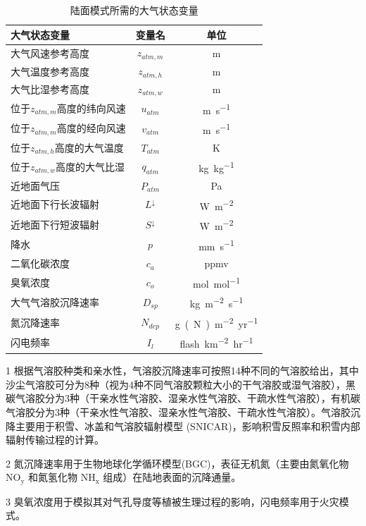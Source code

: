 {
\begin{table}[htbp]
\centering
\caption{陆面模式所需的大气状态变量}
\label{tab:陆面模式所需的大气状态变量}
\begin{threeparttable}
\begin{tabular}{lcc}
\toprule
大气状态变量               & 变量名           & 单位           \\  \midrule
大气风速参考高度             & $z_{atm,m}$   & m            \\
大气温度参考高度             & $z_{atm,h}$   & m            \\
大气比湿参考高度             & $z_{atm,w}$   & m            \\
位于$z_{atm,m}$高度的纬向风速 & $u_{atm}$     & \unit{m.s^{-1}}   \\
位于$z_{atm,m}$高度的经向风速 & $v_{atm}$     & \unit{m.s^{-1}}   \\
位于$z_{atm,h}$高度的大气温度 & $T_{atm}$     & K            \\
位于$z_{atm,w}$高度的大气比湿 & $q_{atm}$     & \unit{kg.kg^{-1}} \\
近地面气压                & $P_{atm}$     & Pa           \\
近地面下行长波辐射            & $L ^\downarrow$ & \unit{W.m^{-2}}   \\
近地面下行短波辐射            & $S ^\downarrow$ & \unit{W.m^{-2}}   \\
降水                   & $p$           & \unit{mm.s^{-1}}      \\
二氧化碳浓度               & $c_a$         & ppmv         \\
臭氧浓度                 & $c_o$         & \unit{mol.mol^{-1}}  \\
大气气溶胶沉降速率        & $D_{sp}$      & \unit{kg.m^{-2}.s^{-1}}  \\
氮沉降速率                & $N_{dep}$     & \unit{g(N).m^{-2}.yr^{-1}}   \\
闪电频率                 & $I_l$         & \unit{flash.km^{-2}.hr^{-1}} \\ \bottomrule    
\end{tabular}
\begin{tablenotes}
\footnotesize
\item[1] 根据气溶胶种类和亲水性，气溶胶沉降速率可按照14种不同的气溶胶给出，其中沙尘气溶胶可分为8种（视为4种不同气溶胶颗粒大小的干气溶胶或湿气溶胶），黑碳气溶胶分为3种（干亲水性气溶胶、湿亲水性气溶胶、干疏水性气溶胶），有机碳气溶胶分为3种（干亲水性气溶胶、湿亲水性气溶胶、干疏水性气溶胶）。气溶胶沉降主要用于积雪、冰盖和气溶胶辐射模型 (SNICAR)，影响积雪反照率和积雪内部辐射传输过程的计算。 
\item[2] 氮沉降速率用于生物地球化学循环模型(BGC)，表征无机氮（主要由氮氧化物 $\mathrm{NO_y}$ 和氮氢化物 $\mathrm{NH_x}$ 组成）在陆地表面的沉降通量。
\item[3] 臭氧浓度用于模拟其对气孔导度等植被生理过程的影响，闪电频率用于火灾模式。
\end{tablenotes}
\end{threeparttable}
\end{table}
}
